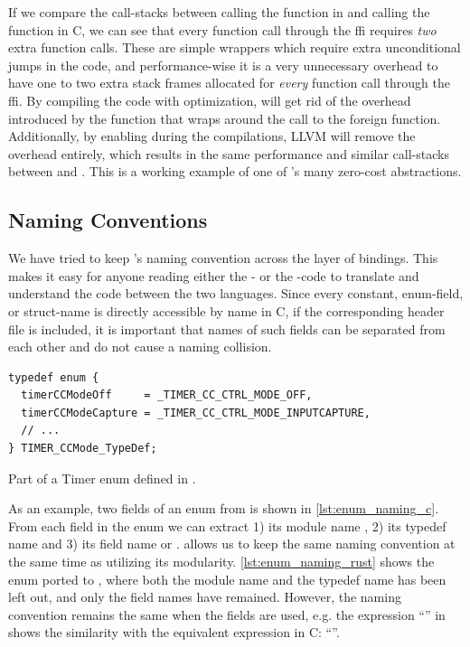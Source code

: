 If we compare the call-stacks between calling the  function in {\rust} and calling the  function in C, we can see that every function call through the \gls{ffi} requires \emph{two} extra function calls.
These are simple wrappers which require extra unconditional jumps in the code, and performance-wise it is a very unnecessary overhead to have one to two extra stack frames allocated for \emph{every} function call through the \gls{ffi}.
By compiling the code with optimization, {\rust} will get rid of the overhead introduced by the function that wraps around the call to the foreign function.
Additionally, by enabling  during the compilations, LLVM will remove the overhead entirely, which results in the same performance and similar call-stacks between {\C} and {\rust}.
This is a working example of one of {\rust}'s many zero-cost abstractions.

\subsection{Naming Conventions}

We have tried to keep \emlib's naming convention across the layer of bindings.
This makes it easy for anyone reading either the {\C}- or the {\rust}-code to translate and understand the code between the two languages.
Since every constant, enum-field, or struct-name is directly accessible by name in C, if the corresponding header file is included, it is important that names of such fields can be separated from each other and do not cause a naming collision.

\begin{listing}[h]
\begin{verbatim}
typedef enum {
  timerCCModeOff     = _TIMER_CC_CTRL_MODE_OFF,
  timerCCModeCapture = _TIMER_CC_CTRL_MODE_INPUTCAPTURE,
  // ...
} TIMER_CCMode_TypeDef;
\end{verbatim}
\caption{Part of a Timer enum defined in {\C}.}
\label{lst:enum_naming_c}
\end{listing}

As an example, two fields of an enum from  is shown in \autoref{lst:enum_naming_c}.
From each field in the enum we can extract 1) its module name , 2) its typedef name  and 3) its field name  or .
\rust allows us to keep the same naming convention at the same time as utilizing its modularity.
\autoref{lst:enum_naming_rust} shows the enum ported to {\rust}, where both the module name and the typedef name has been left out, and only the field names have remained.
However, the naming convention remains the same when the fields are used, e.g. the expression ``'' in {\rust} shows the similarity with the equivalent expression in C: ``''.

